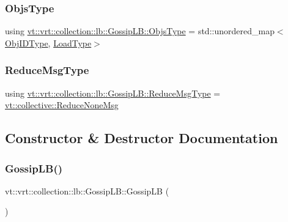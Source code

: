 \subsubsection{\texorpdfstring{Objs\+Type}{ObjsType}}
{\footnotesize\ttfamily using \hyperlink{structvt_1_1vrt_1_1collection_1_1lb_1_1_gossip_l_b_ad2093cf08cc6af0f3deb4441e40c55a9}{vt\+::vrt\+::collection\+::lb\+::\+Gossip\+L\+B\+::\+Objs\+Type} =  std\+::unordered\+\_\+map$<$\hyperlink{structvt_1_1vrt_1_1collection_1_1lb_1_1_base_l_b_a15a2f756b59c8c2437985206b32aa403}{Obj\+I\+D\+Type}, \hyperlink{structvt_1_1vrt_1_1collection_1_1lb_1_1_base_l_b_a215e22b9f12678303f49615ae3be05cc}{Load\+Type}$>$}

\mbox{\label{structvt_1_1vrt_1_1collection_1_1lb_1_1_gossip_l_b_ad251f887a319f433771b084187ef6089}} 
\subsubsection{\texorpdfstring{Reduce\+Msg\+Type}{ReduceMsgType}}
{\footnotesize\ttfamily using \hyperlink{structvt_1_1vrt_1_1collection_1_1lb_1_1_gossip_l_b_ad251f887a319f433771b084187ef6089}{vt\+::vrt\+::collection\+::lb\+::\+Gossip\+L\+B\+::\+Reduce\+Msg\+Type} =  \hyperlink{namespacevt_1_1collective_aa439a90f05078f2bcf918641c951946f}{vt\+::collective\+::\+Reduce\+None\+Msg}}



\subsection{Constructor \& Destructor Documentation}
\mbox{\label{structvt_1_1vrt_1_1collection_1_1lb_1_1_gossip_l_b_a76e6ae6cec011c88a60327b4d7b590eb}} 
\subsubsection{\texorpdfstring{Gossip\+L\+B()}{GossipLB()}\hspace{0.1cm}{\footnotesize\ttfamily [1/2]}}
{\footnotesize\ttfamily vt\+::vrt\+::collection\+::lb\+::\+Gossip\+L\+B\+::\+Gossip\+LB (\begin{DoxyParamCaption}{ }\end{DoxyParamCaption})\hspace{0.3cm}{\ttfamily [default]}}


